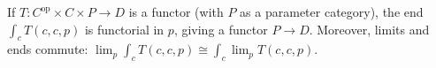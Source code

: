 If $T: C^{\text{op}} \times C \times P \rightarrow D$ is a functor (with $P$ as a parameter category), the end $\int_c T(c, c, p)$ is functorial in $p$, giving a functor $P \rightarrow D$. Moreover, limits and ends commute: $\lim_p \int_c T(c, c, p) \cong \int_c \lim_p T(c, c, p)$.